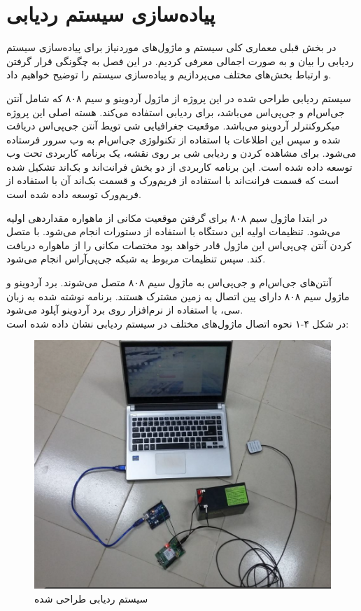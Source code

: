 \chapter{پیاده‌سازی سیستم ردیابی}
در بخش قبلی معماری کلی سیستم و ماژول‌های موردنیاز برای پیاده‌سازی سیستم ردیابی را بیان و به صورت اجمالی معرفی کردیم. در این فصل به چگونگی قرار گرفتن و ارتباط بخش‌های مختلف می‌پردازیم و پیاده‌سازی سیستم را توضیح خواهیم داد.


سیستم ردیابی طراحی شده در این پروژه از ماژول آردوینو و سیم ۸۰۸ که شامل آنتن جی‌اس‌ام و جی‌پی‌اس می‌باشد، برای ردیابی استفاده می‌کند. هسته اصلی این پروژه میکروکنترلر آردوینو می‌باشد. موقعیت جغرافیایی شی تویط آنتن جی‌پی‌اس دریافت شده و سپس این اطلاعات با استفاده از تکنولوژی جی‌اس‌ام به وب سرور فرستاده می‌شود. برای مشاهده کردن و ردیابی شی بر روی نقشه، یک برنامه کاربردی تحت وب توسعه داده شده است. 
این برنامه کاربردی از دو بخش فرانت‌اند و بک‌اند تشکیل شده است که قسمت فرانت‌اند با استفاده از فریم‌ورک  و قسمت بک‌اند آن با استفاده از فریم‌ورک  توسعه داده شده است.
 
 
در ابتدا ماژول سیم ۸۰۸ برای گرفتن موقعیت مکانی از ماهواره مقداردهی اولیه می‌شود. تنظیمات اولیه این دستگاه با استفاده از دستورات  انجام می‌شود. با متصل کردن آنتن چی‌پی‌اس این ماژول قادر خواهد بود مختصات مکانی را از ماهواره دریافت کند. سپس تنظیمات مربوط به شبکه جی‌پی‌آر‌اس انجام می‌شود.


آنتن‌های جی‌اس‌ام و جی‌پی‌اس به ماژول سیم ۸۰۸ متصل می‌شوند. برد آردوینو و ماژول سیم ۸۰۸ دارای پین اتصال به زمین مشترک هستند. برنامه نوشته شده به زبان سی، با استفاده از نرم‌افزار  روی برد آردوینو آپلود می‌شود.
\\
\newpage
در شکل ۴-۱ نحوه اتصال ماژول‌های مختلف در سیستم ردیابی نشان داده شده است:
\begin{figure}[!h]
	\centerline{\includegraphics[width=.6\textwidth]{design-system}}
	\caption{سیستم ردیابی طراحی شده}
\end{figure}

